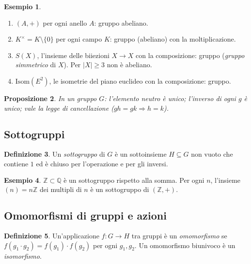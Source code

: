 \documentclass[11pt, a4paper]{book}
\theoremstyle{definition}
\newtheorem{definizione}{Definizione}[section]
\newtheorem{esempio}[definizione]{Esempio}
\theoremstyle{plain}
\newtheorem{proposizione}[definizione]{Proposizione}
\theoremstyle{remark}
\newcommand{\Z}{\mathbb{Z}}
\newcommand{\Q}{\mathbb{Q}}
\begin{document}
\begin{exbox}
\begin{esempio}
\begin{enumerate}
  \item $(A, +)$ per ogni anello $A$: gruppo abeliano.
  \item $K^\times = K \setminus \{0\}$ per ogni campo $K$: gruppo (abeliano) con la moltiplicazione.
  \item $S(X)$, l'insieme delle biiezioni $X \to X$ con la composizione: gruppo (\emph{gruppo simmetrico} di $X$). Per $|X| \geq 3$ non è abeliano.
  \item $\mathrm{Isom}(E^2)$, le isometrie del piano euclideo con la composizione: gruppo.
\end{enumerate}
\end{esempio}
\end{exbox}

\begin{proposizione}
In un gruppo $G$: l'elemento neutro è unico; l'inverso di ogni $g$ è unico; vale la legge di cancellazione ($gh = gk \Rightarrow h = k$).
\end{proposizione}

\subsection{Sottogruppi}

\begin{defbox}
\begin{definizione}
Un \emph{sottogruppo} di $G$ è un sottoinsieme $H \subseteq G$ non vuoto che contiene $1$ ed è chiuso per l'operazione e per gli inversi.
\end{definizione}
\end{defbox}

\begin{exbox}
\begin{esempio}
$\Z \subset \Q$ è un sottogruppo rispetto alla somma. Per ogni $n$, l'insieme $(n) = n\Z$ dei multipli di $n$ è un sottogruppo di $(\Z, +)$.
\end{esempio}
\end{exbox}

\subsection{Omomorfismi di gruppi e azioni}

\begin{defbox}
\begin{definizione}
Un'applicazione $f \colon G \to H$ tra gruppi è un \emph{omomorfismo} se $f(g_1 \cdot g_2) = f(g_1) \cdot f(g_2)$ per ogni $g_1, g_2$. Un omomorfismo biunivoco è un \emph{isomorfismo}.
\end{definizione}
\end{defbox}
\end{document}
